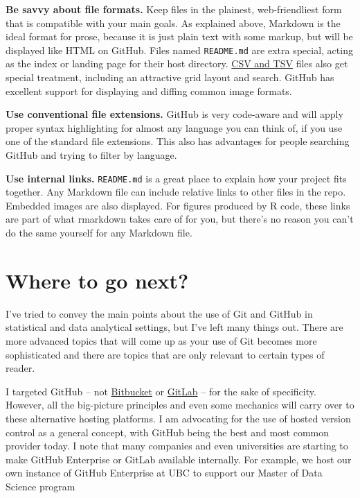 \documentclass[12pt]{article}
\begin{document}
\textbf{Be savvy about file formats.} Keep files in the plainest,
web-friendliest form that is compatible with your main goals. As
explained above, Markdown is the ideal format for prose, because it is
just plain text with some markup, but will be displayed like HTML on
GitHub. Files named \texttt{README.md} are extra special, acting as the
index or landing page for their host directory.
\href{https://help.github.com/articles/rendering-csv-and-tsv-data/}{CSV
and TSV} files also get special treatment, including an attractive grid
layout and search. GitHub has excellent support for displaying and
diffing common image formats.

\textbf{Use conventional file extensions.} GitHub is very code-aware and
will apply proper syntax highlighting for almost any language you can
think of, if you use one of the standard file extensions. This also has
advantages for people searching GitHub and trying to filter by language.

\textbf{Use internal links.} \texttt{README.md} is a great place to
explain how your project fits together. Any Markdown file can include
relative links to other files in the repo. Embedded images are also
displayed. For figures produced by R code, these links are part of what
rmarkdown takes care of for you, but there's no reason you can't do the
same yourself for any Markdown file.

\section{Where to go next?}\label{where-to-go-next}

I've tried to convey the main points about the use of Git and GitHub in
statistical and data analytical settings, but I've left many things out.
There are more advanced topics that will come up as your use of Git
becomes more sophisticated and there are topics that are only relevant
to certain types of reader.

I targeted GitHub -- not \href{https://bitbucket.org}{Bitbucket} or
\href{https://about.gitlab.com}{GitLab} -- for the sake of specificity.
However, all the big-picture principles and even some mechanics will
carry over to these alternative hosting platforms. I am advocating for
the use of hosted version control as a general concept, with GitHub
being the best and most common provider today. I note that many
companies and even universities are starting to make GitHub Enterprise
or GitLab available internally. For example, we host our own instance of
GitHub Enterprise at UBC to support our Master of Data Science program
\end{document}
